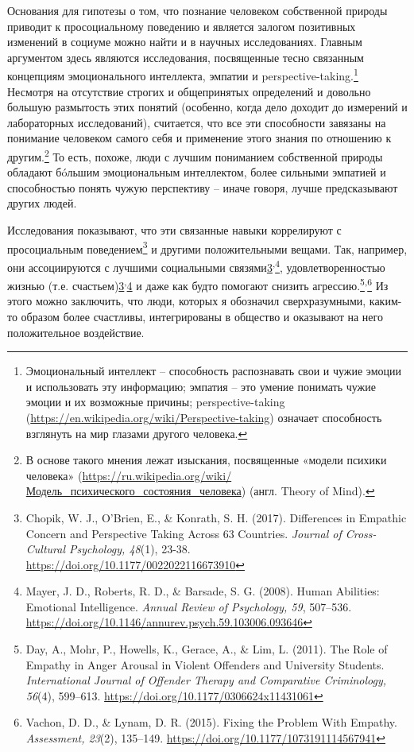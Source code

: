 \documentclass[12pt,a4paper]{report}
\begin{document}
Основания для гипотезы о том, что познание человеком собственной природы приводит к просоциальному поведению и является залогом позитивных изменений в социуме можно найти и в научных исследованиях. Главным аргументом здесь являются исследования, посвященные тесно связанным концепциям эмоционального интеллекта, эмпатии и perspective-taking.\footnote{Эмоциональный интеллект -- способность распознавать свои и чужие эмоции и использовать эту информацию; эмпатия -- это умение понимать чужие эмоции и их возможные причины; perspective-taking (\url{https://en.wikipedia.org/wiki/Perspective-taking}) означает способность взглянуть на мир глазами другого человека.} Несмотря на отсутствие строгих и общепринятых определений и довольно большую размытость этих понятий (особенно, когда дело доходит до измерений и лабораторных исследований), считается, что все эти способности завязаны на понимание человеком самого себя и применение этого знания по отношению к другим.\footnote{В основе такого мнения лежат изыскания, посвященные «модели психики человека» (\href{https://ru.wikipedia.org/wiki/\%D0\%9C\%D0\%BE\%D0\%B4\%D0\%B5\%D0\%BB\%D1\%8C_\%D0\%BF\%D1\%81\%D0\%B8\%D1\%85\%D0\%B8\%D1\%87\%D0\%B5\%D1\%81\%D0\%BA\%D0\%BE\%D0\%B3\%D0\%BE_\%D1\%81\%D0\%BE\%D1\%81\%D1\%82\%D0\%BE\%D1\%8F\%D0\%BD\%D0\%B8\%D1\%8F_\%D1\%87\%D0\%B5\%D0\%BB\%D0\%BE\%D0\%B2\%D0\%B5\%D0\%BA\%D0\%B0}{https://ru.wikipedia.org/wiki/Модель\_психического\_состояния\_человека}) (англ. Theory of Mind).} То есть, похоже, люди с лучшим пониманием собственной природы обладают бóльшим эмоциональным интеллектом, более сильными эмпатией и способностью понять чужую перспективу -- иначе говоря, лучше предсказывают других людей.

\noindent Исследования показывают, что эти связанные навыки коррелируют с просоциальным поведением\footnote{\label{one}Chopik, W. J., O’Brien, E., \& Konrath, S. H. (2017). Differences in Empathic Concern and Perspective Taking Across 63 Countries. \emph{Journal of Cross-Cultural Psychology, 48}(1), 23-38. \url{https://doi.org/10.1177/0022022116673910}} и другими положительными вещами. Так, например, они ассоциируются с лучшими социальными связями\cref{one}\textsuperscript{,}\footnote{\label{two}Mayer, J. D., Roberts, R. D., \& Barsade, S. G. (2008). Human Abilities: Emotional Intelligence. \emph{Annual Review of Psychology, 59}, 507–536. \url{https://doi.org/10.1146/annurev.psych.59.103006.093646}}, удовлетворенностью жизнью (т.е. счастьем)\cref{one}\textsuperscript{,}\cref{two} и даже как будто помогают снизить агрессию.\footnote{Day, A., Mohr, P., Howells, K., Gerace, A., \& Lim, L. (2011). The Role of Empathy in Anger Arousal in Violent Offenders and University Students. \emph{International Journal of Offender Therapy and Comparative Criminology, 56}(4), 599–613. \url{https://doi.org/10.1177/0306624x11431061}}\textsuperscript{,}\footnote{Vachon, D. D., \& Lynam, D. R. (2015). Fixing the Problem With Empathy. \emph{Assessment, 23}(2), 135–149. \url{https://doi.org/10.1177/1073191114567941}} Из этого можно заключить, что люди, которых я обозначил сверхразумными, каким-то образом более счастливы, интегрированы в общество и оказывают на него положительное воздействие.
\end{document}
